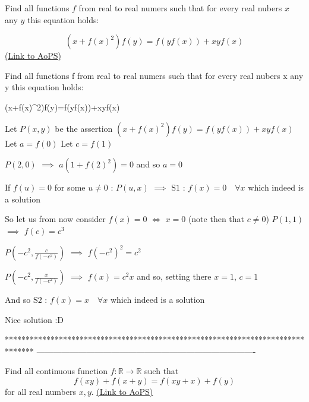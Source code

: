 \begin{problem}
	Find all functions $f$ from real to real numers such that for every real nubers $x$ any $y$ this equation holds:

$$(x+f(x)^2)f(y)=f(yf(x))+xyf(x)$$
	\flushright \href{https://artofproblemsolving.com/community/c6h1568991}{(Link to AoPS)}
\end{problem}



\begin{solution}
	\begin{tcolorbox}Find all functions f from real to real numers such that for every real nubers x any y this equation holds:

(x+f(x)^2)f(y)=f(yf(x))+xyf(x)\end{tcolorbox}
Let $P(x,y)$ be the assertion $(x+f(x)^2)f(y)=f(yf(x))+xyf(x)$
Let $a=f(0)$
Let $c=f(1)$

$P(2,0)$ $\implies$ $a(1+f(2)^2)=0$ and so $a=0$

If $f(u)=0$ for some $u\ne 0$ : $P(u,x)$ $\implies$ 
$\boxed{\text{S1 : }f(x)=0\quad\forall x}$ which indeed is a solution

So let us from now consider $f(x)=0$ $\iff$ $x=0$ (note then that $c\ne 0$)
$P(1,1)$ $\implies$ $f(c)=c^3$

$P(-c^2,\frac c{f(-c^2)})$ $\implies$ $f(-c^2)^2=c^2$

$P(-c^2,\frac x{f(-c^2)})$ $\implies$ $f(x)=c^2x$ and so, setting there $x=1$, $c=1$

And so $\boxed{\text{S2 : }f(x)=x\quad\forall x}$ which indeed is a solution


\end{solution}



\begin{solution}
	Nice solution :D
\end{solution}
*******************************************************************************
-------------------------------------------------------------------------------

\begin{problem}
	Find all continuous function $f : \mathbb{R}\rightarrow\mathbb{R}$ such that 
$$f(xy)+f(x+y)=f(xy+x)+f(y)$$ for all real numbers $x,y$.
	\flushright \href{https://artofproblemsolving.com/community/c6h1569197}{(Link to AoPS)}
\end{problem}



